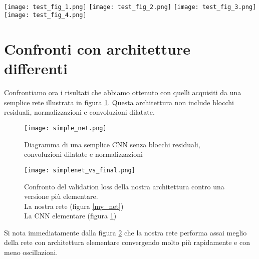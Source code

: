 \noindent{}\\
\texttt{[image: test\_fig\_1.png]}
\texttt{[image: test\_fig\_2.png]}
\texttt{[image: test\_fig\_3.png]}
\texttt{[image: test\_fig\_4.png]}

\section{Confronti con architetture differenti}
Confrontiamo ora i risultati che abbiamo ottenuto con quelli acquisiti da una semplice rete illustrata in figura \ref{simple_net}. Questa architettura non include blocchi residuali, normalizzazioni e convoluzioni dilatate.
\begin{figure}[ht]
    \centering
    \texttt{[image: simple\_net.png]}
    \caption{Diagramma di una semplice CNN senza blocchi residuali, convoluzioni dilatate e normalizzazioni}
    \label{simple_net}
\end{figure}

\begin{figure}[ht]
    \centering
    \texttt{[image: simplenet\_vs\_final.png]}
    \caption[Confronto del validation loss della nostra architettura contro una versione più elementare]{
        Confronto del validation loss della nostra architettura contro una versione più elementare. \\
        \quad La nostra rete (figura \ref{my_net})\\
        \quad La CNN elementare (figura \ref{simple_net})
    }
    \label{simplevsfinal}
\end{figure}

Si nota immediatamente dalla figura \ref{simplevsfinal} che la nostra rete performa assai meglio della rete con architettura elementare convergendo molto più rapidamente e con meno oscillazioni.